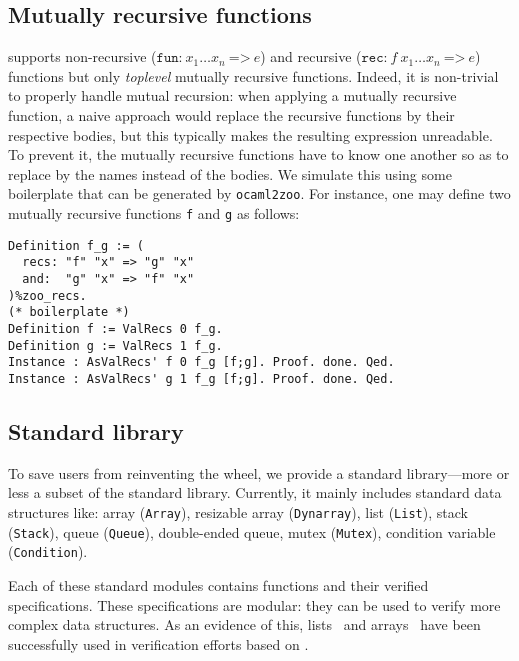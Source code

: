 \subsection{Mutually recursive functions}

\Zoo supports non-recursive ($\texttt{fun:}\ x_1 \dots x_n\ \texttt{=>}\ e$) and recursive ($\texttt{rec:}\ f\ x_1 \dots x_n\ \texttt{=>}\ e$) functions but only \emph{toplevel} mutually recursive functions.
Indeed, it is non-trivial to properly handle mutual recursion: when applying a mutually recursive function, a naive approach would replace the recursive functions by their respective bodies, but this typically makes the resulting expression unreadable.
To prevent it, the mutually recursive functions have to know one another so as to replace by the names instead of the bodies.
We simulate this using some boilerplate that can be generated by \texttt{ocaml2zoo}.
For instance, one may define two mutually recursive functions \texttt{f} and \texttt{g} as follows:

\begin{verbatim}
Definition f_g := (
  recs: "f" "x" => "g" "x"
  and:  "g" "x" => "f" "x"
)%zoo_recs.
(* boilerplate *)
Definition f := ValRecs 0 f_g.
Definition g := ValRecs 1 f_g.
Instance : AsValRecs' f 0 f_g [f;g]. Proof. done. Qed.
Instance : AsValRecs' g 1 f_g [f;g]. Proof. done. Qed.
\end{verbatim}

\subsection{Standard library}

To save users from reinventing the wheel, we provide a standard library---more or less a subset of the \OCaml standard library.
Currently, it mainly includes standard data structures like: array (\texttt{Array}), resizable array (\texttt{Dynarray}), list (\texttt{List}), stack (\texttt{Stack}), queue (\texttt{Queue}), double-ended queue, mutex (\texttt{Mutex}), condition variable (\texttt{Condition}).

Each of these standard modules contains \ZooLang functions and their verified specifications.
These specifications are modular: they can be used to verify more complex data structures.
As an evidence of this, lists~\cite{DBLP:journals/pacmpl/AllainC0S24} and arrays~\cite{allain:hal-04681703} have been successfully used in verification efforts based on \Zoo.

